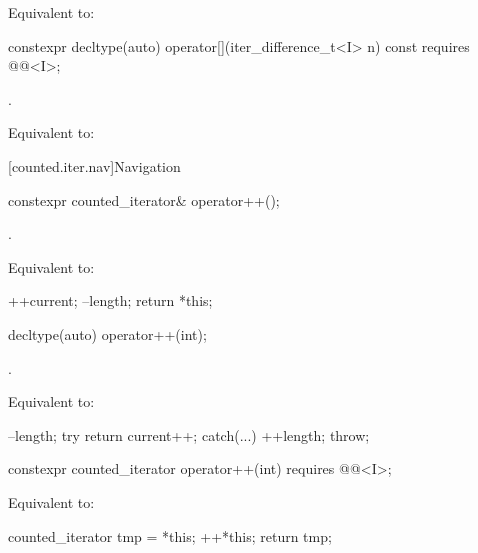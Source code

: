 \begin{itemdescr}
\pnum
\effects
Equivalent to: 
\end{itemdescr}

%
\begin{itemdecl}
constexpr decltype(auto) operator[](iter_difference_t<I> n) const
  requires @@<I>;
\end{itemdecl}

\begin{itemdescr}
\pnum
\expects
{}.

\pnum
\effects
Equivalent to: 
\end{itemdescr}

[counted.iter.nav]{Navigation}

%
\begin{itemdecl}
constexpr counted_iterator& operator++();
\end{itemdecl}

\begin{itemdescr}
\pnum
\expects
{}.

\pnum
\effects
Equivalent to:
\begin{codeblock}
++current;
--length;
return *this;
\end{codeblock}
\end{itemdescr}

%
\begin{itemdecl}
decltype(auto) operator++(int);
\end{itemdecl}

\begin{itemdescr}
\pnum
\expects
{}.

\pnum
\effects
Equivalent to:
\begin{codeblock}
--length;
try { return current++; }
catch(...) { ++length; throw; }
\end{codeblock}
\end{itemdescr}

%
\begin{itemdecl}
constexpr counted_iterator operator++(int)
  requires @@<I>;
\end{itemdecl}

\begin{itemdescr}
\pnum
\effects
Equivalent to:
\begin{codeblock}
counted_iterator tmp = *this;
++*this;
return tmp;
\end{codeblock}
\end{itemdescr}

